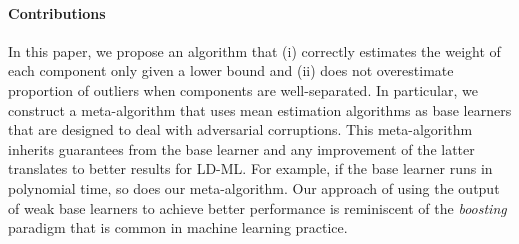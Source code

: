 \paragraph{Contributions}
In this paper, we propose an algorithm that (i) correctly estimates the weight of each component only given a lower bound and (ii) does not overestimate proportion of outliers when components are well-separated. 
In particular, we construct a meta-algorithm that uses mean estimation algorithms as base learners that are designed to deal with adversarial corruptions.
This meta-algorithm inherits guarantees from the base learner and any improvement of the latter translates to better results for LD-ML. For example, if the base learner runs in polynomial time, so does our meta-algorithm.
Our approach of using the output of weak base learners to achieve better performance is reminiscent of the \emph{boosting} paradigm that is common in machine learning practice. 

